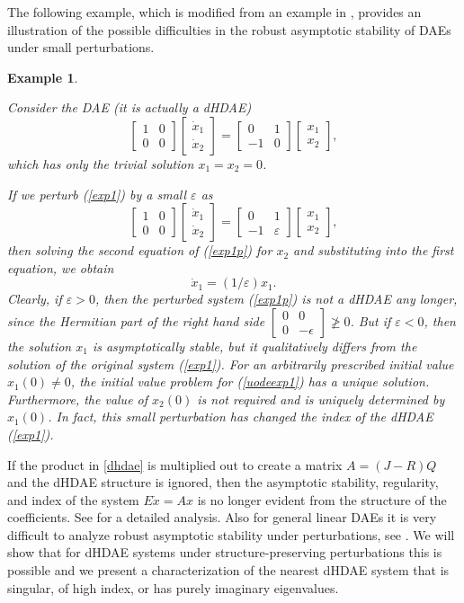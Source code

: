 \documentclass[11pt]{article}
\newcommand {\mat}[1]{\left[\begin{array}{#1}}
\newcommand {\rix}{\end{array}\right]}
\newtheorem{example}[theorem]{Example}
\begin{document}
The following example, which is  modified from an example in \cite{DuLM13}, provides an illustration of the possible difficulties
in the robust asymptotic stability of DAEs under small perturbations.
%
\begin{example}\label{ex:perind}
{\rm
Consider the DAE (it is actually a   dHDAE)
%
\begin{equation}\label{exp1}
\mat {cc} 1 & 0 \\ 0  & 0 \rix \mat {c} \dot x_1 \\ \dot x_2 \rix =\mat {cc} 0 & 1 \\ -1 & 0\rix \mat {c} x_1 \\x_2 \rix,
\end{equation}
which has only the trivial solution $x_1=x_2=0$.

If we perturb (\ref{exp1}) by a small $\varepsilon$ as
%
\begin{equation}\label{exp1p}
\mat {cc} 1 & 0 \\ 0  & 0 \rix \mat {c} {\dot x}_1 \\ {\dot x}_2 \rix =\mat {cc} 0 & 1 \\ -1 & \varepsilon\rix \mat {c} x_1 \\x_2 \rix,
\end{equation}
%
then solving the second equation of (\ref{exp1p}) for $x_2$
and substituting into the first equation, we obtain
%
\begin{equation}\label{uodeexp1}
{\dot x}_1=(1/\varepsilon)x_1.
\end{equation}
%
Clearly, if $\varepsilon>0$, then the perturbed system (\ref{exp1p})  is not a dHDAE any longer, since the Hermitian part of the right hand side $\mat{cc} 0 & 0 \\ 0 &-\epsilon \rix\not \geq 0$. But if $\varepsilon <0$, then the solution  $x_1$ is asymptotically stable, but it qualitatively differs from the solution of the original system (\ref{exp1}). For an arbitrarily prescribed initial value $x_1(0)\neq 0$, the initial value problem for (\ref{uodeexp1}) has a unique solution. Furthermore, the value of $x_2(0)$ is not required and is uniquely determined by $x_1(0)$.
In fact, this small perturbation has changed the index of the dHDAE (\ref{exp1}).
}
\end{example}
%

If the product in \eqref{dhdae} is multiplied out to create a matrix $A=(J-R)Q$ and the dHDAE structure  is ignored, then the asymptotic stability, regularity, and index of the system $E \dot x =A x$ is no longer evident from the structure of the coefficients. See \cite{DuLM13} for a detailed analysis. Also for general linear DAEs it is  very difficult to analyze  robust asymptotic stability under perturbations, see \cite{ByeHM98,GugL25,GugLM17}.
We will show that for dHDAE systems under structure-preserving perturbations this is possible and we present a characterization of  the nearest dHDAE system that is singular, of high index, or has purely imaginary eigenvalues.
\end{document}
